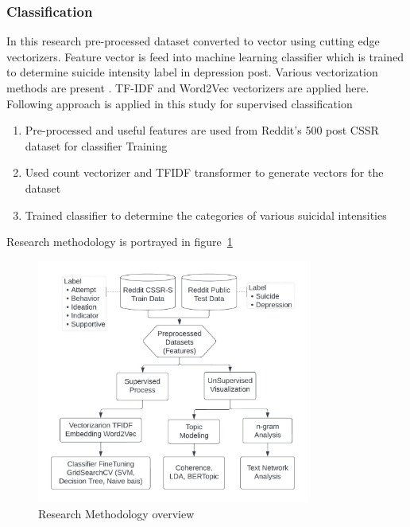 \documentclass[sn-mathphys,Numbered]{sn-jnl}%
\theoremstyle{thmstyleone}%
\theoremstyle{thmstyletwo}%
\theoremstyle{thmstylethree}%
\begin{document}
\subsubsection{Classification}
In this research pre-processed dataset converted to vector using cutting edge vectorizers. Feature vector is feed into machine learning classifier which is trained to determine suicide intensity label in depression post. Various vectorization methods are present \cite{aldhyani2022detecting, wang2020depression, shetty2020predicting}. TF-IDF and Word2Vec vectorizers are applied here. Following approach is applied in this study for supervised classification
\begin{enumerate} [label=(\roman*)]
\item Pre-processed and useful features are used from Reddit's 500 post CSSR dataset for classifier Training
\item Used count vectorizer and TFIDF transformer to generate vectors for the dataset
\item Trained classifier to determine the categories of various suicidal intensities
\end{enumerate}
Research methodology is portrayed in figure~\ref{fig:res_diagram} 
\begin{figure}[h!]
\centering
\includegraphics[width=0.8\textwidth]{res_diagram.jpeg}
\caption{Research Methodology overview}
\label{fig:res_diagram}
\end{figure}
\end{document}
